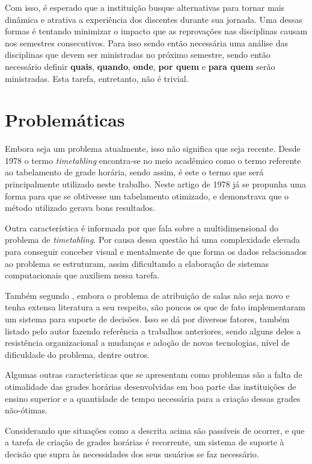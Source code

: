 Com isso, é esperado que a instituição busque alternativas para tornar mais dinâmica e atrativa a experiência dos discentes durante sua jornada. Uma dessas formas é tentando minimizar o impacto que as reprovações nas disciplinas causam nos semestres consecutivos. Para isso sendo então necessária uma análise das disciplinas que devem ser ministradas no próximo semestre, sendo então necessário definir \textbf{quais}, \textbf{quando}, \textbf{onde}, \textbf{por quem} e \textbf{para quem} serão ministradas. Esta tarefa, entretanto, não é trivial.

\section{Problemáticas} \label{sec:Problemáticas} %

Embora seja um problema atualmente, isso não significa que seja recente. Desde 1978 \cite{BARHAM1978} o termo \textit{timetabling} encontra-se no meio acadêmico como o termo referente ao tabelamento de grade horária, sendo assim, é este o termo que será principalmente utilizado neste trabalho. Neste artigo de 1978 já se propunha uma forma para que se obtivesse um tabelamento otimizado, e demonstrava que o método utilizado gerava bons resultados.

Outra característica é informada por  que fala sobre a multidimensional do problema de \textit{timetabling}. Por causa dessa questão há uma complexidade elevada para conseguir conceber visual e mentalmente de que forma os dados relacionados ao problema se estruturam, assim dificultando a elaboração de sistemas computacionais que auxiliem nessa tarefa.

Também segundo , embora o problema de atribuição de salas não seja novo e tenha extensa literatura a seu respeito, são poucos os que de fato implementaram um sistema para suporte de decisões. Isso se dá por diversos fatores, também listado pelo autor fazendo referência a trabalhos anteriores, sendo alguns deles a resistência organizacional a mudanças e adoção de novas tecnologias, nível de dificuldade do problema, dentre outros.

Algumas outras características que se apresentam como problemas são a falta de otimalidade das grades horárias desenvolvidas em boa parte das instituições de ensino superior e a quantidade de tempo necessária para a criação dessas grades não-ótimas.

Considerando que situações como a descrita acima são passíveis de ocorrer, e que a tarefa de criação de grades horárias é recorrente, um sistema de suporte à decisão que supra às necessidades dos seus usuários se faz necessário.


